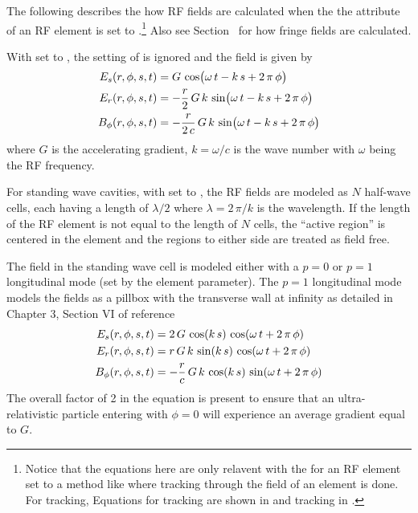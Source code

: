 The following describes the how RF fields are calculated when the the 
attribute of an RF element is set to .\footnote
  {
Notice that the equations here are only relavent with the  for an RF element set
to a method like  where tracking through the field of an element is done.  For
 tracking, Equations for  tracking are shown in 
and  tracking in .
  }
Also see Section~ for how fringe fields are calculated.

With  set to , the setting of  is ignored
and the field is given by
\begin{align}
  E_s(r, \phi, s, t) &= G \, \cos\bigl( \omega \, t - k \, s + 2 \, \pi \, \phi \bigr) \nonumber \\
  E_r(r, \phi, s, t) &= -\frac{r}{2} \, G \, k \, \sin\bigl( \omega \, t - k \, s + 2 \, \pi \, \phi \bigr) \\
  B_\phi(r, \phi, s, t) &= -\frac{r}{2 \, c} \, G \, k \, \sin\bigl( \omega \, t - k \, s + 2 \, \pi \, \phi \bigr) \nonumber
  \label{egot}
\end{align}
where $G$ is the accelerating gradient, $k = \omega / c$ is the wave number with $\omega$ being the
RF frequency.

For standing wave cavities, with  set to , the RF fields are
modeled as $N$ half-wave cells, each having a length of $\lambda/2$ where $\lambda = 2 \, \pi / k$
is the wavelength. If the length of the RF element is not equal to the length of $N$ cells, the
``active region'' is centered in the element and the regions to either side are treated as field
free.

The field in the standing wave cell is modeled either with a $p = 0$ or $p = 1$ longitudinal mode
(set by the  element parameter). The $p = 1$ longitudinal mode models the
fields as a pillbox with the transverse wall at infinity as detailed in Chapter 3, Section VI of
reference \cite{b:lee}
\begin{align}
  E_s(r, \phi, s, t)    &= 2 \, G \,                 \cos(k \, s) \, \cos(\omega \, t + 2 \, \pi \, \phi) \nonumber \\
  E_r(r, \phi, s, t)    &= r \, G \, k \,            \sin(k \, s) \, \cos(\omega \, t + 2 \, \pi \, \phi) \\
  B_\phi(r, \phi, s, t) &= -\frac{r}{c} \, G \, k \, \cos(k \, s) \, \sin(\omega \, t + 2 \, \pi \, \phi) \nonumber
  \label{egot2}
\end{align}
The overall factor of 2 in the equation is present to ensure that an ultra-relativistic particle
entering with $\phi = 0$ will experience an average gradient equal to $G$.

